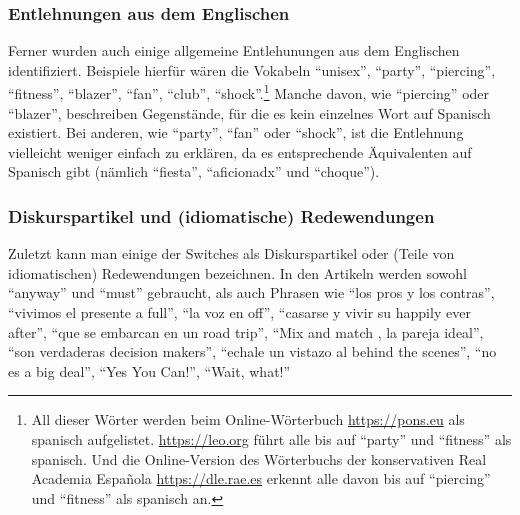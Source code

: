\subsubsection{Entlehnungen aus dem Englischen}
Ferner wurden auch einige allgemeine Entlehunungen aus dem Englischen identifiziert.
Beispiele hierfür wären die Vokabeln ``unisex'', ``party'', ``piercing'', ``fitness'', ``blazer'', ``fan'', ``club'', ``shock''.\footnote{All dieser Wörter werden beim Online-Wörterbuch \url{https://pons.eu} als spanisch aufgelistet. \url{https://leo.org} führt alle bis auf ``party'' und ``fitness'' als spanisch. Und die Online-Version des Wörterbuchs der konservativen Real Academia Española \url{https://dle.rae.es} erkennt alle davon bis auf ``piercing'' und ``fitness'' als spanisch an.}
Manche davon, wie ``piercing'' oder ``blazer'', beschreiben Gegenstände, für die es kein einzelnes Wort auf Spanisch existiert.
Bei anderen, wie ``party'', ``fan'' oder ``shock'',  ist die Entlehnung vielleicht weniger einfach zu erklären, da es entsprechende Äquivalenten auf Spanisch gibt (nämlich ``fiesta'', ``aficionadx'' und ``choque''). %

\subsubsection{Diskurspartikel und (idiomatische) Redewendungen}
Zuletzt kann man einige der Switches als Diskurspartikel oder (Teile von idiomatischen) Redewendungen bezeichnen.
In den Artikeln werden sowohl ``anyway'' und ``must'' gebraucht, als auch Phrasen wie ``los pros y los contras'', ``vivimos el presente a full'', ``la voz en off'', ``casarse y vivir su happily ever after'', ``que se embarcan en un road trip'', ``Mix and match , la pareja ideal'', ``son verdaderas decision makers'', ``echale un vistazo al behind the scenes'', ``no es a big deal'', ``Yes You Can!'', ``Wait, what!''

\begin{comment}
\begin{enumerate}
  \item English interjections as part of the Spanish text:
      ``me di quenta que wow!'', ``pense wow esto es lo que quiro''
  \item Whole phrases in English, not necessarily idiomatic %
  \item Misc: one English word without category at the moment
  \item Cool/slang/hip/life-style
      ``cool''
  \item Personal descriptions
      needy, creepy, charming
  \item Berufe/Stellenbezeichnungen: ``nanny'', ``babysitter'', ``dog walker'', ``coach de lifestyle''
  \item Electrodomestics
      ``juicer'' (in Klammern, next to the spanisch text), ``microwave''
\end{enumerate}
\end{comment}

